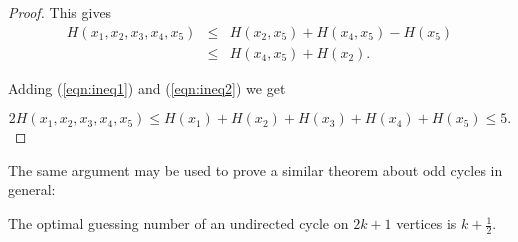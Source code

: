 \begin{proof}
This gives
\begin{eqnarray}
 H(x_1, x_2, x_3, x_4, x_5) & \leq & H(x_2, x_5) + H(x_4, x_5) - H(x_5) \nonumber \\
                            & \leq & H(x_4, x_5) + H(x_2). \label{eqn:ineq2}
\end{eqnarray}

Adding (\ref{eqn:ineq1}) and (\ref{eqn:ineq2}) we get

\[ 2H(x_1, x_2, x_3, x_4, x_5) \leq H(x_1) + H(x_2) + H(x_3) + H(x_4) + H(x_5) \leq 5. \]
\end{proof}

The same argument may be used to prove a similar theorem about odd cycles in general:

\begin{theorem}
 The optimal guessing number of an undirected cycle on $2k + 1$ vertices is $k + \frac{1}{2}$.
\end{theorem}

